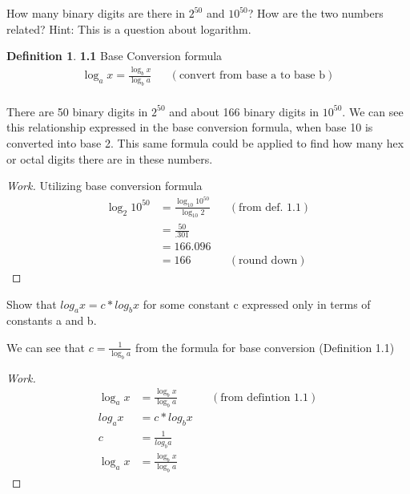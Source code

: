 \documentclass[10pt]{article}
\newenvironment{exercise}[2][Exercise]{\begin{trivlist}
\item[\hskip \labelsep {\bfseries #1}\hskip \labelsep {\bfseries #2.}]}{\end{trivlist}}
\newenvironment{solution}[2][Solution]{\begin{trivlist}
\item[\hskip \labelsep {\bfseries #1}\hskip \labelsep {\bfseries #2.}]}{\end{trivlist}}
\theoremstyle{definition}
\newtheorem*{defn*}{Definition}
\begin{document}
\begin{exercise}{(2a)} %
How many binary digits are there in $2^{50}$ and $10^{50}$? How are the two numbers related?
Hint: This is a question about logarithm.
\end{exercise}

\begin{defn*}{\textbf {1.1}}
Base Conversion formula
\begin{align*}
\log_a x = \frac{\log_b x}{\log_b a} && (\text{convert from base a to base b})\\ 
\end{align*}
\end{defn*}

\begin{solution}{(2a)}
There are 50 binary digits in $2^{50}$ and about 166 binary digits in $10^{50}$. We can see this relationship expressed in the base conversion formula, when base 10 is converted into base 2. This same formula could be applied to find how many hex or octal digits there are in these numbers.  
\end{solution}

\begin{proof}[Work]%
Utilizing base conversion formula
\begin{align*}
\log_2 10^{50} & = \frac{\log_{10} 10^{50}}{\log_{10} 2} && (\text{from def. 1.1})\\
& = \frac{50}{.301} \\
& = 166.096\\
& = 166 && (\text{round down})
\end{align*}
\end{proof}

\begin{exercise}{(2b)} %
Show that $log_a {x} = c * log_b {x}$ for some constant c expressed only in terms of constants
a and b.
\end{exercise}

\begin{solution}{(2b)}
We can see that $c = \frac{1}{\log_b a}$ from the formula for base conversion (Definition 1.1)
\end{solution}

\begin{proof}[Work]
\begin{align*}
\log_a x & = \frac{\log_b x}{\log_b a} && (\text{from defintion 1.1})\\ 
log_a {x} & = c * log_b {x}\\
c & = \frac{1}{log_b {a}}\\
\log_a x & = \frac{\log_b x}{\log_b a} 
\end{align*}
\end{proof}
\end{document}
